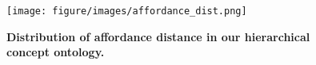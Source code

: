 \begin{figure}
    \centering
    \texttt{[image: figure/images/affordance\_dist.png]}
    \caption{\textbf{Distribution of affordance distance in our hierarchical concept ontology.}}
    \label{fig:afford_dist}
\end{figure}